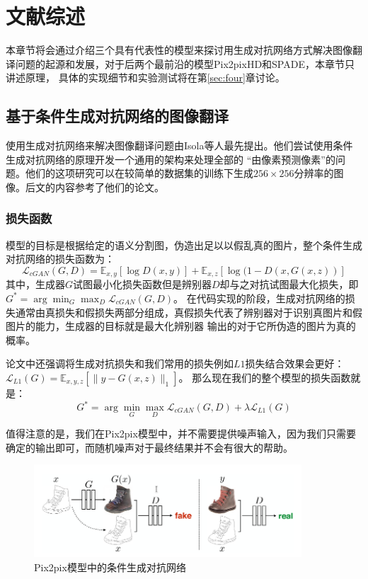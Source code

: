 \documentclass[supercite]{HustGraduPaper}
\theoremstyle{definition}
\begin{document}
\section{文献综述}

本章节将会通过介绍三个具有代表性的模型来探讨用生成对抗网络方式解决图像翻译问题的起源和发展，对于后两个最前沿的模型Pix2pixHD和SPADE，本章节只讲述原理，
具体的实现细节和实验测试将在第\ref{sec:four}章讨论。

\subsection{基于条件生成对抗网络的图像翻译}

使用生成对抗网络来解决图像翻译问题由Isola等人最先提出。他们尝试使用条件生成对抗网络的原理开发一个通用的架构来处理全部的
“由像素预测像素”的问题。他们的这项研究可以在较简单的数据集的训练下生成$256\times256$分辨率的图像。后文的内容参考了他们的论文\cite{pix2pix2016}。

\subsubsection{损失函数}

模型的目标是根据给定的语义分割图，伪造出足以以假乱真的图片，整个条件生成对抗网络的损失函数为：
$$\mathcal{L}_{c G A N}(G, D)=\mathbb{E}_{x, y}[\log D(x, y)]+\mathbb{E}_{x, z}[\log (1-D(x, G(x, z))]$$
其中，生成器$G$试图最小化损失函数但是辨别器$D$却与之对抗试图最大化损失，即$G^{*}=\arg \min _{G} \max _{D} \mathcal{L}_{c G A N}(G, D)$。
在代码实现的阶段，生成对抗网络的损失通常由真损失和假损失两部分组成，真假损失代表了辨别器对于识别真图片和假图片的能力，生成器的目标就是最大化辨别器
输出的对于它所伪造的图片为真的概率。

论文中还强调将生成对抗损失和我们常用的损失例如$L1$损失结合效果会更好：$\mathcal{L}_{L 1}(G)=\mathbb{E}_{x, y, z}\left[\|y-G(x, z)\|_{1}\right]$。
那么现在我们的整个模型的损失函数就是：
$$G^{*}=\arg \min _{G} \max _{D} \mathcal{L}_{c G A N}(G, D)+\lambda \mathcal{L}_{L 1}(G)$$

值得注意的是，我们在Pix2pix模型中，并不需要提供噪声输入，因为我们只需要确定的输出即可，而随机噪声对于最终结果并不会有很大的帮助。
\begin{figure}[H]
  \begin{center}
  \includegraphics[width=10cm]{images/pix2pix-cGAN}
  \end{center}
  \caption{Pix2pix模型中的条件生成对抗网络}
  \label{fig:pix2pix-cGAN}
\end{figure}
\end{document}

